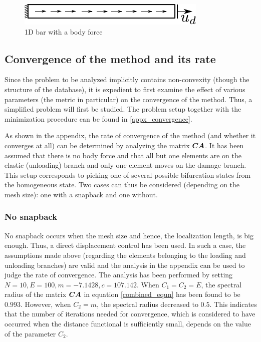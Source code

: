 \documentclass[10pt]{elsarticle}
\begin{document}
\begin{figure}
	\centering
	\includegraphics[width=0.5\linewidth]{Images/1D_bar_bf.pdf}
	\caption{1D bar with a body force \label{1D_bar_bf}}
\end{figure}



\subsection{Convergence of the method and its rate}

Since the problem to be analyzed implicitly contains non-convexity (though the structure of the database), it is expedient to first examine the effect of various parameters (the metric in particular) on the convergence of the method. Thus, a simplified problem will first be studied. The problem setup together with the minimization procedure can be found in \ref{appx_convergence}. 

As shown in the appendix, the rate of convergence of the method (and whether it converges at all) can be determined by analyzing the matrix $\mbox{\boldmath $C$} \mbox{\boldmath $A$} $. It has been assumed that there is no body force and that all but one elements are on the elastic (unloading) branch and only one element moves on the damage branch. This setup corresponds to picking one of several possible bifurcation states from the homogeneous state. Two cases can thus be considered (depending on the mesh size): one with a snapback and one without. 

\subsubsection*{No snapback}
No snapback occurs when the mesh size and hence, the localization length, is big enough. Thus, a direct displacement control has been used. In such a case, the assumptions made above (regarding the elements belonging to the loading and unloading branches) are valid and the analysis in the appendix can be used to judge the rate of convergence. The analysis has been performed by setting $N=10, E=100, m=-7.1428, c=107.142$. When $C_1=C_2=E$, the spectral radius of the matrix $\mbox{\boldmath $C$} \mbox{\boldmath $A$} $ in equation \ref{combined_equn} has been found to be $0.993$. However, when $C_2=m$, the spectral radius decreased to $0.5$. This indicates that the number of iterations needed for convergence, which is considered to have occurred when the distance functional is sufficiently small, depends on the value of the parameter $C_2$.
\end{document}
